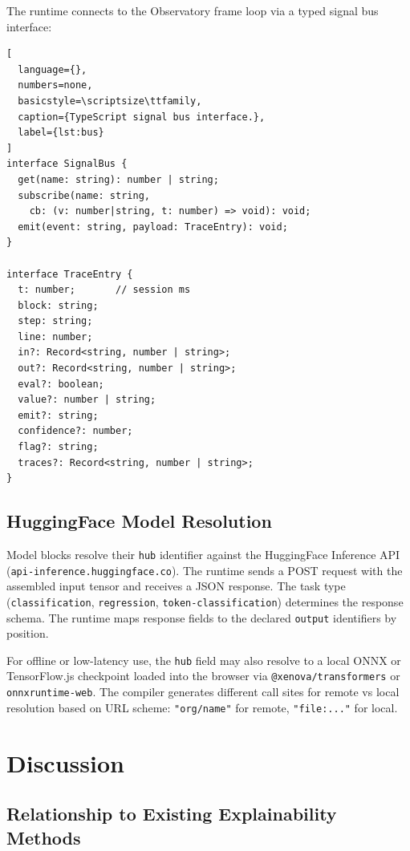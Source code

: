 \documentclass[10pt,twocolumn,a4paper]{article}
\theoremstyle{definition}
\theoremstyle{remark}
\begin{document}
The runtime connects to the Observatory frame loop via a typed signal
bus interface:

\begin{lstlisting}[
  language={},
  numbers=none,
  basicstyle=\scriptsize\ttfamily,
  caption={TypeScript signal bus interface.},
  label={lst:bus}
]
interface SignalBus {
  get(name: string): number | string;
  subscribe(name: string,
    cb: (v: number|string, t: number) => void): void;
  emit(event: string, payload: TraceEntry): void;
}

interface TraceEntry {
  t: number;       // session ms
  block: string;
  step: string;
  line: number;
  in?: Record<string, number | string>;
  out?: Record<string, number | string>;
  eval?: boolean;
  value?: number | string;
  emit?: string;
  confidence?: number;
  flag?: string;
  traces?: Record<string, number | string>;
}
\end{lstlisting}

\subsection{HuggingFace Model Resolution}

Model blocks resolve their \texttt{hub} identifier against the
HuggingFace Inference API (\texttt{api-inference.huggingface.co}).
The runtime sends a POST request with the assembled input tensor
and receives a JSON response.  The task type (\texttt{classification},
\texttt{regression}, \texttt{token-classification}) determines the
response schema.  The runtime maps response fields to the declared
\texttt{output} identifiers by position.

For offline or low-latency use, the \texttt{hub} field may also
resolve to a local ONNX or TensorFlow.js checkpoint loaded into the
browser via \texttt{@xenova/transformers} or \texttt{onnxruntime-web}.
The compiler generates different call sites for remote vs local
resolution based on URL scheme: \texttt{"org/name"} for remote,
\texttt{"file:..."} for local.

\section{Discussion}
\label{sec:discussion}

\subsection{Relationship to Existing Explainability Methods}
\end{document}
